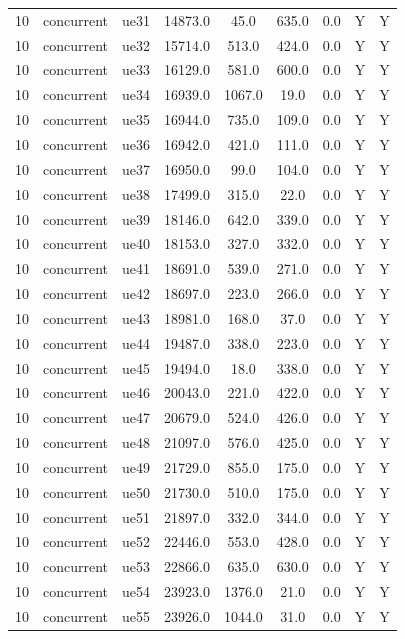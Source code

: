 \begin{table}[ht]
\begin{tabular}{|c|c|c|c|c|c|c|c|c|}
10 & concurrent & ue31 & 14873.0 & 45.0 & 635.0 & 0.0 & Y & Y \\
10 & concurrent & ue32 & 15714.0 & 513.0 & 424.0 & 0.0 & Y & Y \\
10 & concurrent & ue33 & 16129.0 & 581.0 & 600.0 & 0.0 & Y & Y \\
10 & concurrent & ue34 & 16939.0 & 1067.0 & 19.0 & 0.0 & Y & Y \\
10 & concurrent & ue35 & 16944.0 & 735.0 & 109.0 & 0.0 & Y & Y \\
10 & concurrent & ue36 & 16942.0 & 421.0 & 111.0 & 0.0 & Y & Y \\
10 & concurrent & ue37 & 16950.0 & 99.0 & 104.0 & 0.0 & Y & Y \\
10 & concurrent & ue38 & 17499.0 & 315.0 & 22.0 & 0.0 & Y & Y \\
10 & concurrent & ue39 & 18146.0 & 642.0 & 339.0 & 0.0 & Y & Y \\
10 & concurrent & ue40 & 18153.0 & 327.0 & 332.0 & 0.0 & Y & Y \\
10 & concurrent & ue41 & 18691.0 & 539.0 & 271.0 & 0.0 & Y & Y \\
10 & concurrent & ue42 & 18697.0 & 223.0 & 266.0 & 0.0 & Y & Y \\
10 & concurrent & ue43 & 18981.0 & 168.0 & 37.0 & 0.0 & Y & Y \\
10 & concurrent & ue44 & 19487.0 & 338.0 & 223.0 & 0.0 & Y & Y \\
10 & concurrent & ue45 & 19494.0 & 18.0 & 338.0 & 0.0 & Y & Y \\
10 & concurrent & ue46 & 20043.0 & 221.0 & 422.0 & 0.0 & Y & Y \\
10 & concurrent & ue47 & 20679.0 & 524.0 & 426.0 & 0.0 & Y & Y \\
10 & concurrent & ue48 & 21097.0 & 576.0 & 425.0 & 0.0 & Y & Y \\
10 & concurrent & ue49 & 21729.0 & 855.0 & 175.0 & 0.0 & Y & Y \\
10 & concurrent & ue50 & 21730.0 & 510.0 & 175.0 & 0.0 & Y & Y \\
10 & concurrent & ue51 & 21897.0 & 332.0 & 344.0 & 0.0 & Y & Y \\
10 & concurrent & ue52 & 22446.0 & 553.0 & 428.0 & 0.0 & Y & Y \\
10 & concurrent & ue53 & 22866.0 & 635.0 & 630.0 & 0.0 & Y & Y \\
10 & concurrent & ue54 & 23923.0 & 1376.0 & 21.0 & 0.0 & Y & Y \\
10 & concurrent & ue55 & 23926.0 & 1044.0 & 31.0 & 0.0 & Y & Y \\

\end{tabular}
\end{table}

